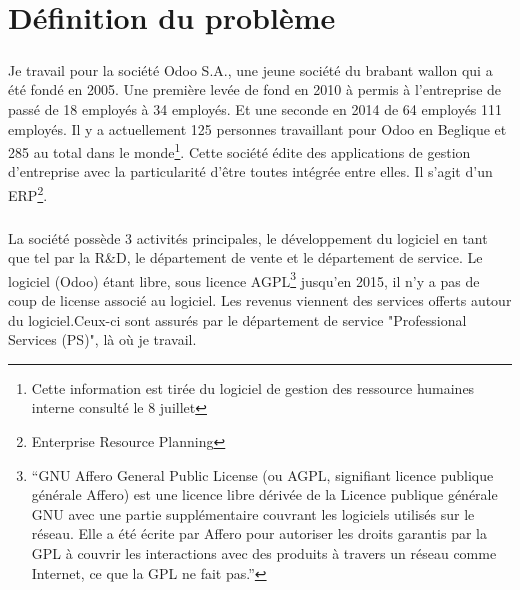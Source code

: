 \chapter{Définition du problème}
\paragraph*{}Je travail pour la société Odoo S.A., une jeune société du brabant wallon qui a été fondé en 2005. Une première levée de fond en 2010 à permis à l'entreprise de passé de 18 employés à 34 employés. Et une seconde en 2014 de 64 employés 111 employés. Il y a actuellement 125 personnes travaillant pour Odoo en Beglique et 285 au total dans le monde\footnote{Cette information est tirée du logiciel de gestion des ressource humaines interne consulté le 8 juillet}. Cette société édite des applications de gestion d'entreprise avec la particularité d'être toutes intégrée entre elles. Il s'agit d'un ERP\footnote{Enterprise Resource Planning\cite{wikierp}}. 


\paragraph*{}La société possède 3 activités principales, le développement du logiciel en tant que tel par la R\&D, le département de vente et le département de service. Le logiciel (Odoo) étant libre, sous licence AGPL\footnote{\enquote{GNU Affero General Public License (ou AGPL, signifiant licence publique générale Affero) est une licence libre dérivée de la Licence publique générale GNU avec une partie supplémentaire couvrant les logiciels utilisés sur le réseau. Elle a été écrite par Affero pour autoriser les droits garantis par la GPL à couvrir les interactions avec des produits à travers un réseau comme Internet, ce que la GPL ne fait pas.}\cite{agpl}} jusqu'en 2015\cite{odoonewlicense}, il n'y a pas de coup de license associé au logiciel. Les revenus viennent des services offerts autour du logiciel.Ceux-ci sont assurés par le département de service "Professional Services (PS)", là où je travail. 

